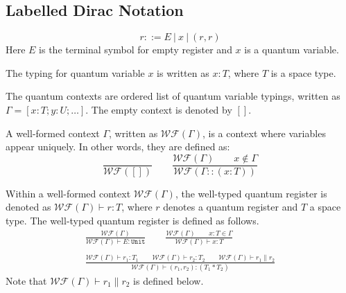 \subsection{Labelled Dirac Notation}

\begin{definition}
  $$
  r ::= E\ |\ x\ |\ (r, r)
  $$
  Here $E$ is the terminal symbol for empty register and $x$ is a quantum variable.
\end{definition}

\begin{definition}
  The typing for quantum variable $x$ is written as $x : T$, where $T$ is a space type.
\end{definition}

\begin{definition}
  The quantum contexts are ordered list of quantum variable typings, written as $\Gamma = [x : T; y : U; \dots]$. The empty context is denoted by $[]$.
\end{definition}

\begin{definition}
  A well-formed context $\Gamma$, written as $\mathcal{WF}(\Gamma)$, is a context where variables appear uniquely. In other words, they are defined as:
  $$
  \frac{}{\mathcal{WF}([])}
  \qquad
  \frac{\mathcal{WF}(\Gamma)\qquad x \notin \Gamma}{\mathcal{WF}(\Gamma :: (x : T))}
  $$
\end{definition}


\begin{definition}
  Within a well-formed context $\mathcal{WF}(\Gamma)$, the well-typed quantum register is denoted as $\mathcal{WF}(\Gamma) \vdash r : T$, where $r$ denotes a quantum register and $T$ a space type. The well-typed quantum register is defined as follows.
  \begin{gather*}
  \frac{\mathcal{WF}(\Gamma)}{\mathcal{WF}(\Gamma) \vdash E : \texttt{Unit}}
  \qquad
  \frac{\mathcal{WF}(\Gamma)\qquad x:T \in \Gamma}{\mathcal{WF}(\Gamma) \vdash x : T}\\
  \ \\  
  \frac{\mathcal{WF}(\Gamma) \vdash r_1 : T_1 \qquad \mathcal{WF}(\Gamma) \vdash r_2 : T_2\qquad \mathcal{WF}(\Gamma) \vdash r_1 \| r_2}{\mathcal{WF}(\Gamma) \vdash (r_1, r_2) : (T_1 * T_2) }
  \end{gather*}
  Note that $\mathcal{WF}(\Gamma) \vdash r_1 \| r_2$ is defined below.
\end{definition}


